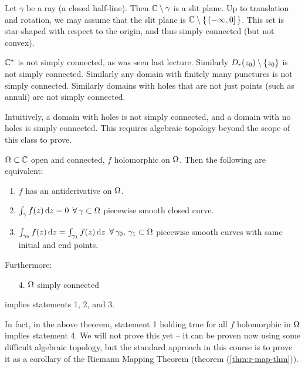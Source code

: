 \begin{example}
Let $\gamma$ be a ray (a closed half-line).
Then $\mathbb{C} \setminus \gamma$ is a slit plane. Up to translation and rotation, we may assume that the slit plane is $\mathbb{C} \setminus \set{(-\infty , 0] }$. This set is star-shaped with respect to the origin, and thus simply connected (but not convex).

\end{example}


\begin{counterexample}
$\mathbb{C}^*$ is not simply connected, as was seen last lecture. Similarly $D_r (z_0) \setminus \{ z_0 \}$ is not simply connected. Similarly any domain with finitely many punctures is not simply connected. Similarly domains with holes that are not just points (such as annuli) are not simply connected.
\end{counterexample}

\begin{note}
Intuitively, a domain with holes is not simply connected, and a domain with no holes is simply connected. This requires algebraic topology beyond the scope of this class to prove.
\end{note}

\begin{theorem}\label{thm:char-simp-conn}
$\Omega \subset \mathbb{C}$ open and connected, $f$ holomorphic on $\Omega$. Then the following are equivalent:
\begin{enumerate}
    \item $f$ has an antiderivative on $\Omega$.
    \item $\int_\gamma f(z) \dif z = 0$ $\forall \, \gamma \subset \Omega$ piecewise smooth closed curve.
    \item $\int_{\gamma_0} f(z) \dif z = \int_{\gamma_1} f(z) \dif z$ $\forall \, \gamma_0, \, \gamma_1 \subset \Omega$ piecewise smooth curves with same initial and end points.
\end{enumerate}

Furthermore:
\begin{enumerate}
    \item[4.] $\Omega$ simply connected
\end{enumerate}
implies statements 1, 2, and 3.

\end{theorem}

\begin{remark}
In fact, in the above theorem, statement 1 holding true for all $f$ holomorphic in $\Omega$ implies statement 4. We will not prove this yet -- it can be proven now using some difficult algebraic topology, but the standard approach in this course is to prove it as a corollary of the Riemann Mapping Theorem (theorem (\ref{thm:r-map-thm})).
\end{remark}

